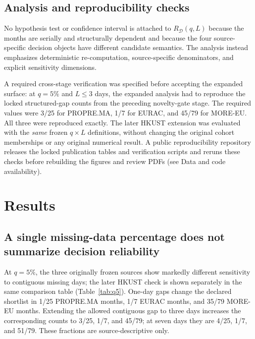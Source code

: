 \documentclass[preprint,12pt]{elsarticle}
\begin{document}
\subsection{Analysis and reproducibility checks}
No hypothesis test or confidence interval is attached to $R_{\mathcal{D}}(q,L)$ because the months are serially and structurally dependent and because the four source-specific decision objects have different candidate semantics. The analysis instead emphasizes deterministic re-computation, source-specific denominators, and explicit sensitivity dimensions.

A required cross-stage verification was specified before accepting the expanded surface: at $q=5\%$ and $L\leq3$ days, the expanded analysis had to reproduce the locked structured-gap counts from the preceding novelty-gate stage. The required values were 3/25 for PROPRE.MA, 1/7 for EURAC, and 45/79 for MORE-EU. All three were reproduced exactly. The later HKUST extension was evaluated with the \emph{same} frozen $q\times L$ definitions, without changing the original cohort memberships or any original numerical result. A public reproducibility repository releases the locked publication tables and verification scripts and reruns these checks before rebuilding the figures and review PDFs (see Data and code availability).

\section{Results}
\subsection{A single missing-data percentage does not summarize decision reliability}
At $q=5\%$, the three originally frozen sources show markedly different sensitivity to contiguous missing days; the later HKUST check is shown separately in the same comparison table (Table~\ref{tab:q5}). One-day gaps change the declared shortlist in 1/25 PROPRE.MA months, 1/7 EURAC months, and 35/79 MORE-EU months. Extending the allowed contiguous gap to three days increases the corresponding counts to 3/25, 1/7, and 45/79; at seven days they are 4/25, 1/7, and 51/79. These fractions are source-descriptive only.
\end{document}
